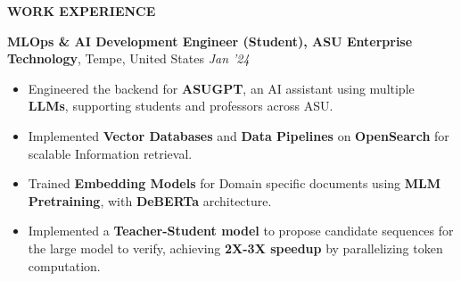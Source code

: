 \documentclass[10pt,a4]{article}
\def\hrulefill{\leavevmode\leaders\hrule height 1pt\hfill\kern0pt}		%
\begin{document}
{\begin{flushleft}
    

\end{flushleft}
		
		
		
\begin{flushleft}
    {\Large \textbf{WORK EXPERIENCE}} %

    \vspace{1.5mm}
    \textbf{\large MLOps \& AI Development Engineer (Student), ASU Enterprise Technology},   Tempe, United States \hfill \textit{\large Jan '24}	\\
    \begin{itemize}
        \item Engineered the backend for \textbf{ASUGPT}, an AI assistant using multiple \textbf{LLMs}, supporting students and professors across ASU.
        \item Implemented \textbf{Vector Databases} and \textbf{Data Pipelines} on \textbf{OpenSearch} for scalable Information retrieval.
        \item Trained \textbf{Embedding Models} for Domain specific documents using \textbf{MLM Pretraining}, with  \textbf{DeBERTa} architecture.
        \item Implemented a \textbf{Teacher-Student model} to propose candidate sequences for the large model to verify, achieving \textbf{2X-3X speedup} by parallelizing token computation.
    

\end{itemize}
\end{flushleft}}
\end{document}

